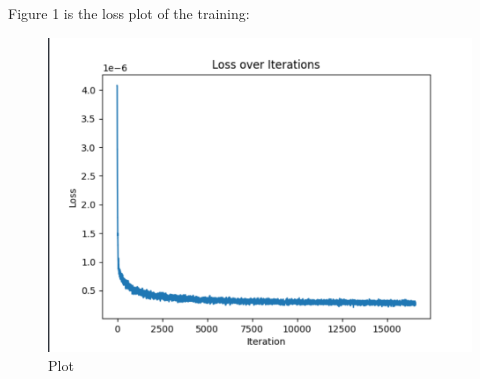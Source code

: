 \documentclass[conference]{IEEEtran}
\begin{document}
Figure 1 is the loss plot of the training:
\begin{figure}[!h]
  \centering
  \includegraphics[scale=0.2]{./images/cosineloss.png}
  \caption{Plot}
\end{figure} 


\end{document}
